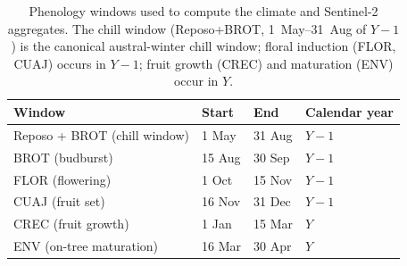 \begin{table}[H]
\caption{Phenology windows used to compute the climate and Sentinel-2 aggregates.
The chill window (Reposo+BROT, 1~May--31~Aug of $Y-1$) is the canonical
austral-winter chill window; floral induction (FLOR, CUAJ) occurs in $Y-1$;
fruit growth (CREC) and maturation (ENV) occur in $Y$.\label{tab:pheno_windows}}
\centering
\small
\begin{tabular}{llll}
\toprule
\textbf{Window} & \textbf{Start} & \textbf{End} & \textbf{Calendar year} \\
\midrule
Reposo + BROT (chill window) & 1 May  & 31 Aug & $Y-1$ \\
BROT (budburst)               & 15 Aug & 30 Sep & $Y-1$ \\
FLOR (flowering)              & 1 Oct  & 15 Nov & $Y-1$ \\
CUAJ (fruit set)              & 16 Nov & 31 Dec & $Y-1$ \\
CREC (fruit growth)           & 1 Jan  & 15 Mar & $Y$   \\
ENV (on-tree maturation)      & 16 Mar & 30 Apr & $Y$   \\
\bottomrule
\end{tabular}
\end{table}
